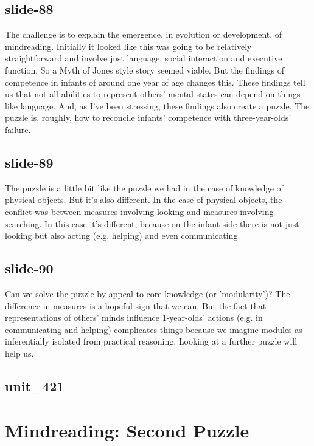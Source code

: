 \documentclass[12pt,\papersize]{extarticle}
\begin{document}
 
\subsection{slide-88}
The challenge is to explain the emergence, in evolution or development, of mindreading.
Initially it looked like this was going to be relatively straightforward and involve just language, social interaction and executive function.
So a Myth of Jones style story seemed viable.
But the findings of competence in infants of around one year of age changes this.
These findings tell us that not all abilities to represent others' mental states can depend on things like language.
And, as I've been stressing, these findings also create a puzzle.
The puzzle is, roughly, how to reconcile infants' competence with three-year-olds' failure.
 
 
\subsection{slide-89}
The puzzle is a little bit like the puzzle we had in the case of knowledge of physical objects.
But it's also different.
In the case of physical objects, the conflict was between measures involving looking and measures involving searching.
In this case it's different, because on the infant side there is not just looking but also acting (e.g. helping) and even communicating.
 
 
\subsection{slide-90}
Can we solve the puzzle by appeal to core knowledge (or 'modularity')?
The difference in measures is a hopeful sign that we can.
But the fact that representations of others' minds influence 1-year-olds' actions (e.g. in communicating and helping) complicates things because we imagine modules as inferentially isolated from practical reasoning.
Looking at a further puzzle will help us.
 
 
\subsection{unit\_421}
 
\section{Mindreading: Second Puzzle}
 
 
\end{document}

